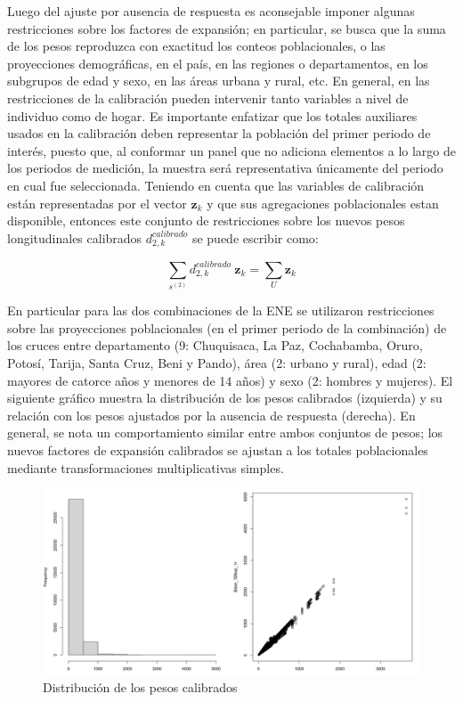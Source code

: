 \documentclass[
  10pt,
  spanish,
]{book}
\begin{document}
Luego del ajuste por ausencia de respuesta es aconsejable imponer algunas restricciones sobre los factores de expansión; en particular, se busca que la suma de los pesos reproduzca con exactitud los conteos poblacionales, o las proyecciones demográficas, en el país, en las regiones o departamentos, en los subgrupos de edad y sexo, en las áreas urbana y rural, etc. En general, en las restricciones de la calibración pueden intervenir tanto variables a nivel de individuo como de hogar. Es importante enfatizar que los totales auxiliares usados en la calibración deben representar la población del primer periodo de interés, puesto que, al conformar un panel que no adiciona elementos a lo largo de los periodos de medición, la muestra será representativa únicamente del periodo en cual fue seleccionada. Teniendo en cuenta que las variables de calibración están representadas por el vector \(\mathbf{z}_k\) y que sus agregaciones poblacionales estan disponible, entonces este conjunto de restricciones sobre los nuevos pesos longitudinales calibrados \(d_{2, k}^{calibrado}\) se puede escribir como:

\[
\sum_{s^{(2)}} d_{2, k}^{calibrado} \  \mathbf{z}_k = \sum_{U} \mathbf{z}_k
\]

En particular para las dos combinaciones de la ENE se utilizaron restricciones sobre las proyecciones poblacionales (en el primer periodo de la combinación) de los cruces entre departamento (9: Chuquisaca, La Paz, Cochabamba, Oruro, Potosí, Tarija, Santa Cruz, Beni y Pando), área (2: urbano y rural), edad (2: mayores de catorce años y menores de 14 años) y sexo (2: hombres y mujeres). El siguiente gráfico muestra la distribución de los pesos calibrados (izquierda) y su relación con los pesos ajustados por la ausencia de respuesta (derecha). En general, se nota un comportamiento similar entre ambos conjuntos de pesos; los nuevos factores de expansión calibrados se ajustan a los totales poblacionales mediante transformaciones multiplicativas simples.

\begin{figure}
\centering
\includegraphics{Pics/el4.png}
\caption{Distribución de los pesos calibrados}
\end{figure}
\end{document}
